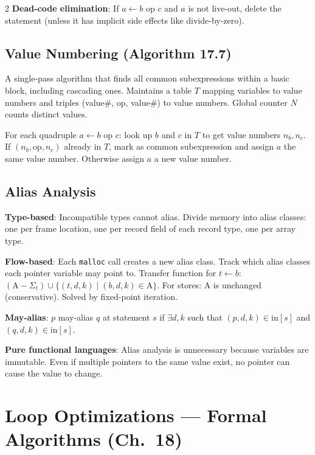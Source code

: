 \documentclass[9pt,landscape]{extarticle}
\begin{document}
\begin{multicols}{2}
\textbf{Dead-code elimination}: If $a \leftarrow b$ op $c$ and $a$ is not live-out, delete the statement (unless it has implicit side effects like divide-by-zero).

\subsection{Value Numbering (Algorithm 17.7)}

A single-pass algorithm that finds all common subexpressions within a basic block, including cascading ones. Maintains a table $T$ mapping variables to value numbers and triples (value\#, op, value\#) to value numbers. Global counter $N$ counts distinct values.

For each quadruple $a \leftarrow b$ op $c$: look up $b$ and $c$ in $T$ to get value numbers $n_b, n_c$. If $(n_b, \text{op}, n_c)$ already in $T$, mark as common subexpression and assign $a$ the same value number. Otherwise assign $a$ a new value number.

\subsection{Alias Analysis}

\textbf{Type-based}: Incompatible types cannot alias. Divide memory into alias classes: one per frame location, one per record field of each record type, one per array type.

\textbf{Flow-based}: Each \texttt{malloc} call creates a new alias class. Track which alias classes each pointer variable may point to. Transfer function for $t \leftarrow b$: $(\text{A} - \Sigma_t) \cup \{(t, d, k) \mid (b, d, k) \in \text{A}\}$. For stores: A is unchanged (conservative). Solved by fixed-point iteration.

\textbf{May-alias}: $p$ may-alias $q$ at statement $s$ if $\exists d, k$ such that $(p, d, k) \in \text{in}[s]$ and $(q, d, k) \in \text{in}[s]$.

\textbf{Pure functional languages}: Alias analysis is unnecessary because variables are immutable. Even if multiple pointers to the same value exist, no pointer can cause the value to change.

\section{Loop Optimizations --- Formal Algorithms (Ch.~18)}


\end{multicols}
\end{document}
